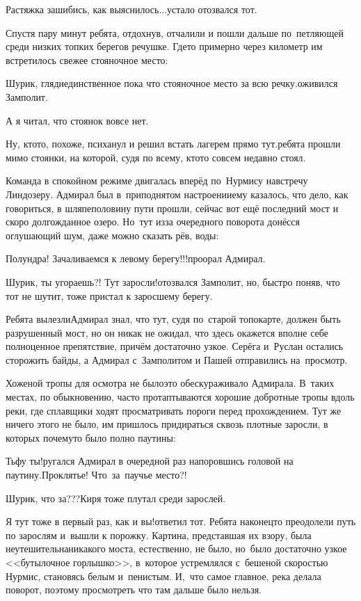 \diagdash Растяжка зашибись, как выяснилось$\ldots$\mdash устало отозвался тот.

Спустя пару минут ребята, отдохнув, отчалили и пошли дальше по~петляющей среди низких топких берегов речушке. Где\sdash то примерно через километр им встретилось свежее стояночное место:

\diagdash Шурик, гляди\mdash единственное пока что стояночное место за всю речку.\mdash оживился Замполит.

\diagdash А я читал, что стоянок вовсе нет.

\diagdash Ну, кто\sdash то, похоже, психанул и решил встать лагерем прямо тут.\mdash ребята прошли мимо стоянки, на которой, судя по всему, кто\sdash то совсем недавно стоял.

Команда в спокойном режиме двигалась вперёд по~Нурмису навстречу Линдозеру. Адмирал был в~приподнятом настроении\mdash ему казалось, что дело, как говориться, в шляпе\mdash половину пути прошли, сейчас вот ещё последний мост и скоро долгожданное озеро. Но~тут из\sdash за очередного поворота донёсся оглушающий шум, даже можно сказать рёв, воды:

\diagdash Полундра! Зачаливаемся к левому берегу!!!\mdash проорал Адмирал.

\diagdash Шурик, ты угораешь?! Тут заросли!\mdash отозвался Замполит, но, быстро поняв, что тот не шутит, тоже пристал к заросшему берегу.

Ребята вылезли\mdash Адмирал знал, что тут, судя по~старой топокарте, должен быть разрушенный мост, но он никак не ожидал, что здесь окажется вполне себе полноценное препятствие, причём достаточно узкое. Серёга и~Руслан остались сторожить байды, а Адмирал с~Замполитом и Пашей отправились на~просмотр. 

Хоженой тропы для осмотра не было\mdash это обескураживало Адмирала. В~таких местах, по обыкновению, часто протаптываются хорошие добротные тропы вдоль реки, где сплавщики ходят просматривать пороги перед прохождением. Тут же ничего этого не было, им пришлось придираться сквозь плотные заросли, в которых почему\sdash то было полно паутины:

\diagdash Тьфу ты!\mdash ругался Адмирал в очередной раз напоровшись головой на паутину.\mdash Проклятье! Что~за~паучье место?!

\diagdash Шурик, что за???\mdash Киря тоже плутал среди зарослей.

\diagdash Я тут тоже в первый раз, как и вы!\mdash ответил тот. Ребята наконец\sdash то преодолели путь по зарослям и~вышли к порожку. Картина, представшая их взору, была неутешительна\mdash никакого моста, естественно, не было, но~было достаточно узкое <<бутылочное горлышко>>, в~которое устремлялся с~бешеной скоростью Нурмис, становясь белым и~пенистым. И,~что самое главное, река делала поворот, поэтому просмотреть что там дальше было нельзя. 

